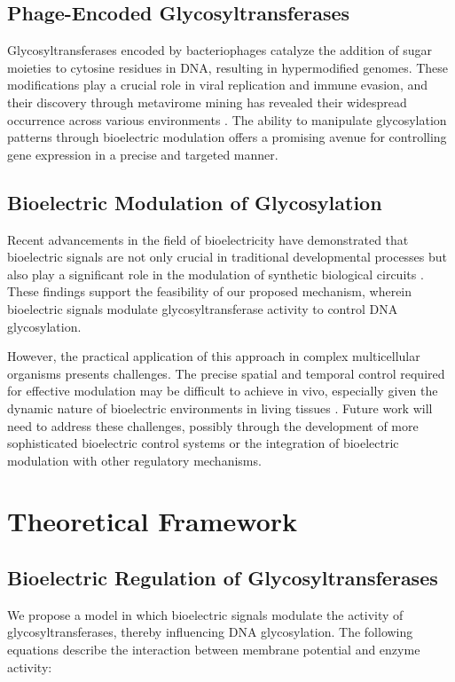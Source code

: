 \documentclass[12pt]{article}
\begin{document}
\subsection{Phage-Encoded Glycosyltransferases}
Glycosyltransferases encoded by bacteriophages catalyze the addition of sugar moieties to cytosine residues in DNA, resulting in hypermodified genomes. These modifications play a crucial role in viral replication and immune evasion, and their discovery through metavirome mining has revealed their widespread occurrence across various environments \cite{richter2020structures, pyle2024virus}. The ability to manipulate glycosylation patterns through bioelectric modulation offers a promising avenue for controlling gene expression in a precise and targeted manner.

\subsection{Bioelectric Modulation of Glycosylation}
Recent advancements in the field of bioelectricity have demonstrated that bioelectric signals are not only crucial in traditional developmental processes but also play a significant role in the modulation of synthetic biological circuits \cite{morgan2022bioelectric, patel2023bioelectric}. These findings support the feasibility of our proposed mechanism, wherein bioelectric signals modulate glycosyltransferase activity to control DNA glycosylation.

However, the practical application of this approach in complex multicellular organisms presents challenges. The precise spatial and temporal control required for effective modulation may be difficult to achieve in vivo, especially given the dynamic nature of bioelectric environments in living tissues \cite{nguyen2023bioelectric}. Future work will need to address these challenges, possibly through the development of more sophisticated bioelectric control systems or the integration of bioelectric modulation with other regulatory mechanisms.

\section{Theoretical Framework}

\subsection{Bioelectric Regulation of Glycosyltransferases}
We propose a model in which bioelectric signals modulate the activity of glycosyltransferases, thereby influencing DNA glycosylation. The following equations describe the interaction between membrane potential and enzyme activity:
\end{document}

